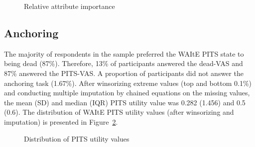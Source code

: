 \documentclass[
  number,
  preprint]{elsarticle}
\begin{document}
\begin{figure}


\caption{\label{fig-rai}Relative attribute importance}

\end{figure}%

\subsection{Anchoring}\label{anchoring}

The majority of respondents in the sample preferred the WAItE PITS state
to being dead (87\%). Therefore, 13\% of participants answered the
dead-VAS and 87\% answered the PITS-VAS. A proportion of participants
did not answer the anchoring task (1.67\%). After winsorizing extreme
values (top and bottom 0.1\%) \citep{2003ApplyingTechniques} and
conducting multiple imputation by chained equations on the missing
values, the mean (SD) and median (IQR) PITS utility value was 0.282
(1.456) and 0.5 (0.6). The distribution of WAItE PITS utility values
(after winsorizing and imputation) is presented in
Figure~\ref{fig-hist}.

\begin{figure}


\caption{\label{fig-hist}Distribution of PITS utility values}

\end{figure}%
\end{document}
